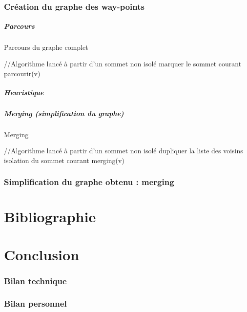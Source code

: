 \documentclass[a4paper,12pt]{report}
\begin{document}
\subsection{Création du graphe des way-points}

\paragraph{Parcours}

\begin{algorithm}[t]
\caption{Parcours du graphe complet}
\label{parcours_graphe}
\begin{algorithmic}[1]
\STATE //Algorithme lancé à partir d'un sommet non isolé
  \STATE marquer le sommet courant
    \STATE parcourir(v)
  \ENDFOR
\ENDIF
\end{algorithmic}
\end{algorithm}

\paragraph{Heuristique}

\paragraph{Merging (simplification du graphe)}

\begin{algorithm}[t]
\caption{Merging}
\label{merging_graphe}
\begin{algorithmic}[1]
\STATE //Algorithme lancé à partir d'un sommet non isolé
  \STATE dupliquer la liste des voisins
      \STATE isolation du sommet courant
    \ENDIF
  \ENDIF
    \STATE merging(v)
  \ENDFOR
\ENDIF
\end{algorithmic}
\end{algorithm}

\subsection{Simplification du graphe obtenu : merging}

\chapter{Bibliographie}

\chapter{Conclusion}

\subsection*{Bilan technique}

\subsection*{Bilan personnel}
\end{document}
